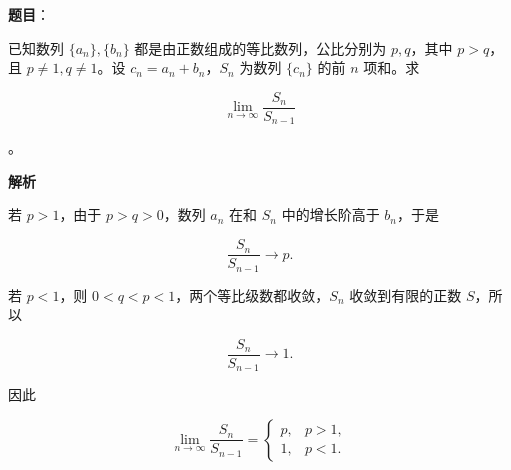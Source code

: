 \begin{answer}

\textbf{题目}：

已知数列 $\{a_n\},\{b_n\}$ 都是由正数组成的等比数列，公比分别为 $p,q$，其中 $p>q$，且 $p\neq1,q\neq1$。设 $c_n=a_n+b_n$，$S_n$ 为数列 $\{c_n\}$ 的前 $n$ 项和。求

\nopagebreak[4]
\[
\lim_{n\to\infty}\dfrac{S_n}{S_{n-1}}
\]

。

\textbf{解析}

若 $p>1$，由于 $p>q>0$，数列 $a_n$ 在和 $S_n$ 中的增长阶高于 $b_n$，于是

\nopagebreak[4]
\[
\frac{S_n}{S_{n-1}}
\longrightarrow p.
\]

若 $p<1$，则 $0<q<p<1$，两个等比级数都收敛，$S_n$ 收敛到有限的正数 $S$，所以

\nopagebreak[4]
\[
\frac{S_n}{S_{n-1}}\longrightarrow1.
\]

因此

\nopagebreak[4]
\[
\lim_{n\to\infty}\frac{S_n}{S_{n-1}}
=
\begin{cases}
p,&p>1,\\
1,&p<1.
\end{cases}
\]


\end{answer}
